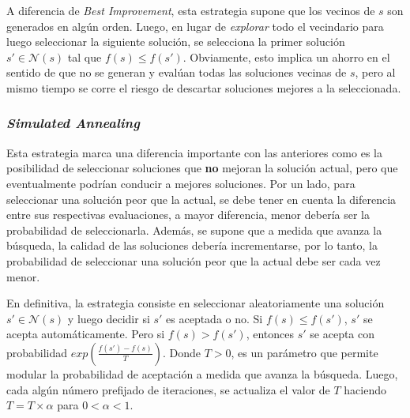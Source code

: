 A diferencia de \textit{Best Improvement}, esta estrategia supone que los
vecinos de $s$ son generados en alg\'un orden. Luego, en lugar de
\textit{explorar} todo el vecindario para luego seleccionar la
siguiente soluci\'on, se selecciona la primer soluci\'on $s' \in
\mathcal{N}(s)$ tal que $f(s) \leq f(s')$. Obviamente, esto implica un ahorro en
el sentido de que no se generan y eval\'uan todas las soluciones vecinas de $s$,
pero al mismo tiempo se corre el riesgo de descartar soluciones mejores a la
seleccionada.

\subsubsection{\textit{Simulated Annealing}}

Esta estrategia marca una diferencia importante con las anteriores como es la
posibilidad de seleccionar soluciones que \textbf{no} mejoran la soluci\'on
actual, pero que eventualmente podr\'ian conducir a mejores soluciones. Por un
lado, para seleccionar una soluci\'on peor que la actual, se debe tener en
cuenta la diferencia entre sus respectivas evaluaciones, a mayor diferencia,
menor deber\'ia ser la probabilidad de seleccionarla. Adem\'as, se supone que a
medida que avanza la b\'usqueda, la calidad de las soluciones deber\'ia
incrementarse, por lo tanto, la probabilidad de seleccionar una soluci\'on peor
que la actual debe ser cada vez menor.

En definitiva, la estrategia consiste en seleccionar aleatoriamente una
soluci\'on $s' \in \mathcal{N}(s)$ y luego decidir si $s'$ es aceptada o no.
Si $f(s) \leq f(s')$, $s'$ se acepta autom\'aticamente. Pero si $f(s) > f(s')$,
entonces $s'$ se acepta con probabilidad $exp(\frac{f(s') - f(s)}{T})$. Donde $T
> 0$, es un par\'ametro que permite modular la probabilidad de aceptaci\'on a
medida que avanza la b\'usqueda. Luego, cada alg\'un n\'umero prefijado de
iteraciones, se actualiza el valor de $T$ haciendo $T = T\times \alpha$ para $0
< \alpha < 1$.

